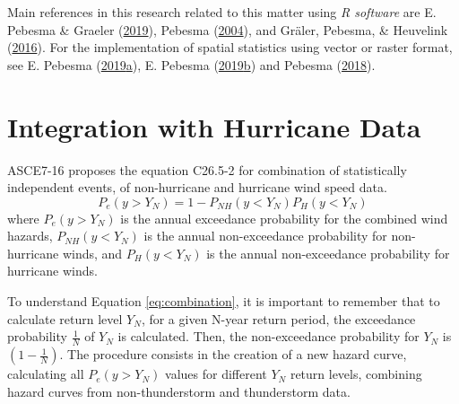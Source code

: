 \documentclass[12pt,oneside]{reedthesis}
\begin{document}
Main references in this research related to this matter using \emph{R software} are E. Pebesma \& Graeler (\protect\hyperlink{ref-Pebesma2019}{2019}), Pebesma (\protect\hyperlink{ref-Pebesma2004}{2004}), and Gräler, Pebesma, \& Heuvelink (\protect\hyperlink{ref-Graeler2016}{2016}). For the implementation of spatial statistics using vector or raster format, see E. Pebesma (\protect\hyperlink{ref-Pebesma2019a}{2019}\protect\hyperlink{ref-Pebesma2019a}{a}), E. Pebesma (\protect\hyperlink{ref-Pebesma2019b}{2019}\protect\hyperlink{ref-Pebesma2019b}{b}) and Pebesma (\protect\hyperlink{ref-Pebesma2018}{2018}).

\hypertarget{integration}{%
\section{Integration with Hurricane Data}\label{integration}}

ASCE7-16 proposes the equation C26.5-2 for combination of statistically independent events, of non-hurricane and hurricane wind speed data.
\begin{equation}
          P_e(y>Y_N) = 1 - P_{NH}(y<Y_N)P_{H}(y<Y_N)
  \label{eq:combination}
\end{equation}
where \(P_e(y>Y_N)\) is the annual exceedance probability for the combined wind hazards, \(P_{NH}(y<Y_N)\) is the annual non-exceedance probability for non-hurricane winds, and \(P_{H}(y<Y_N)\) is the annual non-exceedance probability for hurricane winds.

To understand Equation \eqref{eq:combination}, it is important to remember that to calculate return level \(Y_N\), for a given N-year return period, the exceedance probability \(\frac{1}{N}\) of \(Y_N\) is calculated. Then, the non-exceedance probability for \(Y_N\) is \(\left(1-\frac{1}{N}\right)\). The procedure consists in the creation of a new hazard curve, calculating all \(P_e(y>Y_N)\) values for different \(Y_N\) return levels, combining hazard curves from non-thunderstorm and thunderstorm data.
\end{document}
